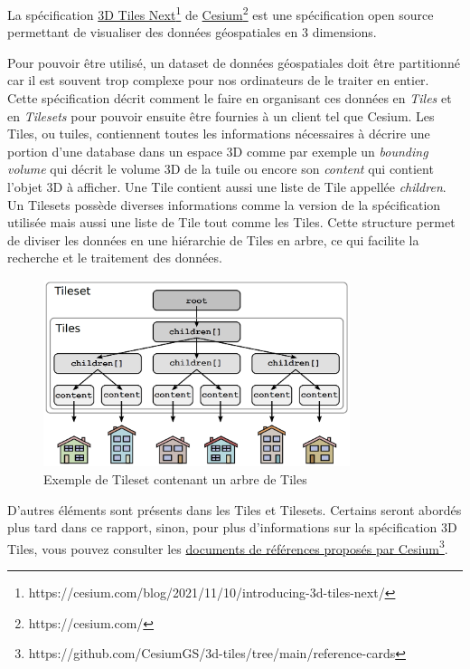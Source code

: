 La spécification \href{https://cesium.com/blog/2021/11/10/introducing-3d-tiles-next/}{3D Tiles Next}\footnote{https://cesium.com/blog/2021/11/10/introducing-3d-tiles-next/} de \href{https://cesium.com/}{Cesium}\footnote{https://cesium.com/} est une spécification open source permettant de visualiser des données géospatiales en 3 dimensions.

Pour pouvoir être utilisé, un dataset de données géospatiales doit être partitionné car il est souvent trop complexe pour nos ordinateurs de le traiter en entier. Cette spécification décrit comment le faire en organisant ces données en \textit{Tiles} et en \textit{Tilesets} pour pouvoir ensuite être fournies à un client tel que Cesium. Les Tiles, ou tuiles, contiennent toutes les informations nécessaires à décrire une portion d'une database dans un espace 3D comme par exemple un \textit{bounding volume} qui décrit le volume 3D de la tuile ou encore son \textit{content} qui contient l'objet 3D à afficher. Une Tile contient aussi une liste de Tile appellée \textit{children}. Un Tilesets possède diverses informations comme la version de la spécification utilisée mais aussi une liste de Tile tout comme les Tiles. Cette structure permet de diviser les données en une hiérarchie de Tiles en arbre, ce qui facilite la recherche et le traitement des données.

\begin{figure}[H]
    \centering
    \includegraphics[width=0.8\textwidth]{assets/figures/Tilesets.png}
    \caption{Exemple de Tileset contenant un arbre de Tiles \cite{3d-tiles-reference-card-v1}}
    \label{fig:Tilesets}
\end{figure}

D'autres éléments sont présents dans les Tiles et Tilesets. Certains seront abordés plus tard dans ce rapport, sinon, pour plus d'informations sur la spécification 3D Tiles, vous pouvez consulter les \href{https://github.com/CesiumGS/3d-tiles/tree/main/reference-cards}{documents de références proposés par Cesium}\footnote{https://github.com/CesiumGS/3d-tiles/tree/main/reference-cards}.